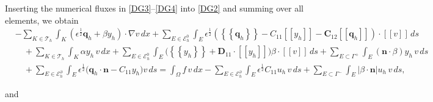 \documentclass[a4paper,10pt]{article}
\newcommand {\average}[1] {\mbox{$\left\{\!\!\left\{ #1 \right\}\!\!\right\}$}}
\newcommand {\jump}[1] {\mbox{$\left[\!\left[ #1 \right]\!\right]$}}
\newcommand{\hF}{{\frac{1}{2}}}
\newcommand{\cT}{{\mathcal{T}}}
\newcommand{\cE}{{\mathcal{E}}}
\newcommand{\bq}{{\mathbf{q}}}
\newcommand{\bn}{{\mathbf{n}}}
\numberwithin{theorem}{section}
\begin{document}
Inserting the numerical fluxes in \eqref{DG3}--\eqref{DG4} into \eqref{DG2} and summing over all elements, we obtain
\begin{align*}
&-\sum\limits_{K \in \cT_h} \int_{K} (\epsilon^{\hF} \bq_h + \beta y_h) \cdot \nabla v \, dx  
+ \sum\limits_{E \in \cE_h^0} \int_E \epsilon^{\hF} 
\left( \average{\bq_h} - C_{11} \jump{y_h} - \mathbf{C}_{12} \jump{\bq_h} \right) 
\cdot \jump{v} \, ds \\
&\quad + \sum\limits_{K \in \cT_h} \int_{K} \alpha y_h \, v \, dx 
+ \sum\limits_{E \in \cE_h^0} \int_E 
\big( \average{y_h} + \mathbf{D}_{11} \cdot \jump{y_h} \big) 
\beta \cdot \jump{v} \, ds 
+ \sum\limits_{E \subset \Gamma^+} \int_E (\bn \cdot \beta) y_h \, v \, ds \\
&\quad + \sum\limits_{E \in \cE_h^{\partial}} \int_E 
\epsilon^{\hF} \big( \bq_h \cdot \bn - C_{11} y_h \big) v \, ds 
= \int_{\Omega} f \, v \, dx 
- \sum\limits_{E \in \cE_h^{\partial}} \int_E \epsilon^{\hF} C_{11} u_h \, v \, ds 
+ \sum\limits_{E \subset \Gamma^-} \int_E |\beta \cdot \bn| u_h \, v \, ds,
\end{align*}

and
\end{document}
